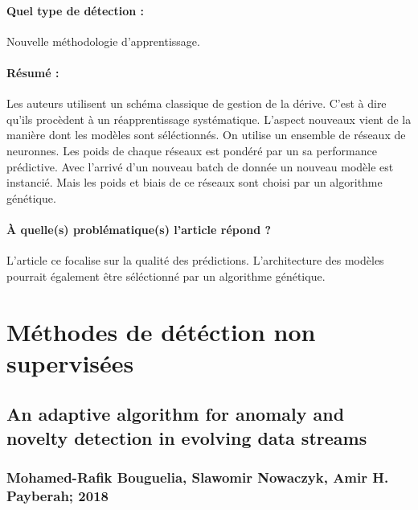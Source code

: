 \documentclass[11pt,a4paper]{report}
\begin{document}
\paragraph{Quel type de détection :} Nouvelle méthodologie d'apprentissage.

\paragraph{Résumé :} Les auteurs utilisent un schéma classique de gestion de la dérive. C'est à dire qu'ils procèdent à un réapprentissage systématique. L'aspect nouveaux vient de la manière dont les modèles sont séléctionnés. On utilise un ensemble de réseaux de neuronnes. Les poids de chaque réseaux est pondéré par un sa performance prédictive. Avec l'arrivé d'un nouveau batch de donnée un nouveau modèle est instancié. Mais les poids et biais de ce réseaux sont choisi par un algorithme génétique.

\paragraph{À quelle(s) problématique(s) l'article répond ?} L'article ce focalise sur la qualité des prédictions. L'architecture des modèles pourrait également être séléctionné par un algorithme génétique.











\newpage



















\section{Méthodes de détéction non supervisées}

\subsection{An adaptive algorithm for anomaly and novelty detection in evolving data streams}
\subsubsection{Mohamed-Rafik Bouguelia, Slawomir Nowaczyk, Amir H. Payberah; 2018}
\end{document}
